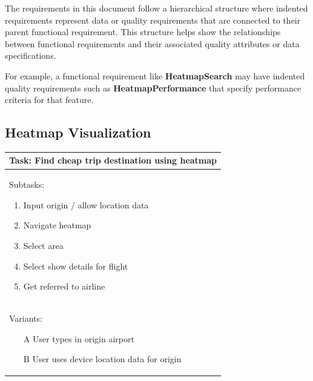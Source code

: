 The requirements in this document follow a hierarchical structure where indented requirements represent data or quality requirements that are connected to their parent functional requirement. This structure helps show the relationships between functional requirements and their associated quality attributes or data specifications.

For example, a functional requirement like \textbf{HeatmapSearch} may have indented quality requirements such as \textbf{HeatmapPerformance} that specify performance criteria for that feature.

\subsection{Heatmap Visualization}

\begin{tabular}{|p{}|}
    \hline
    \textbf{Task:  Find cheap trip destination using heatmap}\\
    \hline
    Subtasks:
    \begin{enumerate}
        \item Input origin / allow location data
        \item Navigate heatmap
        \item Select area
        \item Select show details for flight
        \item Get referred to airline
    \end{enumerate}\\
    \hline
    Variants:
    \begin{enumerate}
        \item[A] User types in origin airport
        \item[B] User uses device location data for origin
    \end{enumerate}\\
    \hline
\end{tabular}

